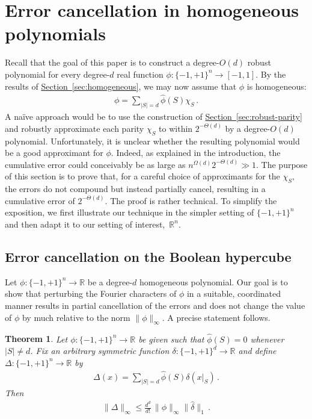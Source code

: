 \documentclass[10pt]{article}
\newtheorem{theorem}{Theorem}[section]
\theoremstyle{definition}
\numberwithin{equation}{section}
\newcommand{\R}{{\mathbb R}}
\newcommand{\expref}[2]{\texorpdfstring{\hyperref[#2]{#1~\ref{#2}}}{#1~\ref{#2}}}
\newcommand{\moo}{\{-1,+1\}}
\newcommand{\moon}{\moo^n}
\begin{document}
\section{Error cancellation in homogeneous polynomials}

Recall that
the goal of this paper is to construct a degree-$O(d)$ robust
polynomial for every degree-$d$ real function
$\phi\colon\moon\to[-1,1]$. By
the results of \expref{Section}{sec:homogeneous}, we may
now assume that $\phi$ is homogeneous:
\begin{align*}
\phi = \sum_{|S|=d} \hat\phi(S)\chi_S\,.
\end{align*}
A na\"ive approach would be to use the construction of
\expref{Section}{sec:robust-parity} and robustly
approximate each parity $\chi_S$ to within
$2^{-\Theta(d)}$ by a degree-$O(d)$ polynomial.
Unfortunately, it is unclear whether the resulting
polynomial would be a good approximant for $\phi$.
Indeed, as explained in the introduction,
the cumulative error 
could conceivably be as large as $n^{\Omega(d)} 
2^{-\Theta(d)}\gg1$.
The purpose of this section is to prove that, for a
careful choice of approximants for the $\chi_S,$ the
errors do not compound but instead partially cancel,
resulting in a cumulative error of
$2^{-\Theta(d)}$. The proof is rather technical.
To simplify the exposition, we first illustrate our
technique in the simpler setting of $\moon$ and
then adapt it to our setting of interest,~$\R^n$. 

\subsection*{Error cancellation on the Boolean hypercube}
Let $\phi\colon\moon\to\R$ be a degree-$d$ homogeneous
polynomial. Our
goal is to show that perturbing the Fourier characters of
$\phi$ in a suitable, coordinated manner results in
partial cancellation of the errors and does not change 
the value of $\phi$ by much
relative to the norm $\|\phi\|_\infty$.  A precise
statement follows.

\begin{theorem}
\label{thm:error-compounding-multilinear}
Let $\phi\colon\moon\to\R$ be given such that
$\hat\phi(S)=0$ whenever $|S|\ne d$.
Fix an arbitrary symmetric function
$\delta\colon\moo^d\to\R$ and define
$\Delta\colon\moon\to\R$ by
\begin{align*}
\Delta(x) = \sum_{|S|=d}\hat\phi(S) \delta(x|_S)\,.
\end{align*}
Then
\begin{align*}
\|\Delta\|_\infty \leq 
\frac{d^d}{d!}\, \|\phi\|_\infty \|\hat \delta\|_1\,.
\end{align*}
\end{theorem}
\end{document}
